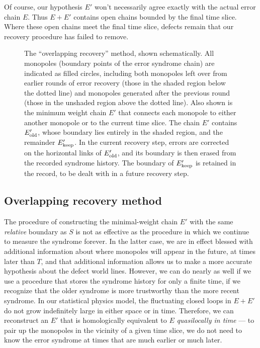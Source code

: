 Of course, our hypothesis $E'$ won't necessarily agree exactly with the actual error chain $E$. Thus $E+E'$ contains open chains bounded by the final time slice. Where these open chains meet the final time slice, defects remain that our recovery procedure has failed to remove.

\begin{figure}
\begin{center}
\leavevmode
\epsfxsize=3.5in
\end{center}
\caption{The ``overlapping recovery'' method, shown schematically. All monopoles (boundary points of the error syndrome chain) are indicated as filled circles, including both monopoles left over from earlier rounds of error recovery (those in the shaded region below the dotted line) and monopoles generated after the previous round (those in the unshaded region above the dotted line). Also shown is the minimum weight chain $E'$ that connects each monopole to either another monopole or to the current time slice. The chain $E'$ contains $E'_{\rm old}$, whose boundary lies entirely in the shaded region, and the remainder $E'_{\rm keep}$. In the current recovery step, errors are corrected on the horizontal links of $E'_{\rm old}$, and its boundary is then erased from the recorded syndrome history. The boundary of $E'_{\rm keep}$ is retained in the record, to be dealt with in a future recovery step.}
\label{fig:overlap}
\end{figure}

\subsection{Overlapping recovery method}
The procedure of constructing the minimal-weight chain $E'$ with the same {\em relative} boundary as $S$ is not as effective as the procedure in which we continue to measure the syndrome forever. In the latter case, we are in effect blessed with additional information about where monopoles will appear in the future, at times later than $T$, and that additional information allows us to make a more accurate hypothesis about the defect world lines. However, we can do nearly as well if we use a procedure that stores the syndrome history for only a finite time, if we recognize that the older syndrome is more trustworthy than the more recent syndrome. In our statistical physics model, the fluctuating closed loops in $E+E'$ do not grow indefinitely large in either space or in time. Therefore, we can reconstruct an $E'$ that is homologically equivalent to $E$ {\em quasilocally in time} --- to pair up the monopoles in the vicinity of a given time slice, we do not need to know the error syndrome at times that are much earlier or much later.

